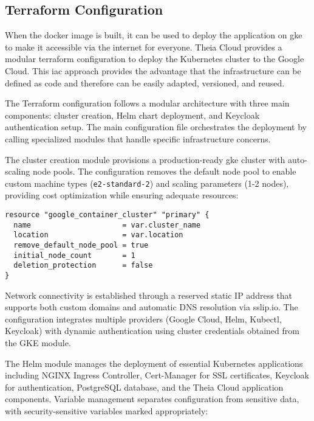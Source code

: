  \subsection{Terraform Configuration}
\label{subsec:terraform-configuration}

When the docker image is built, it can be used to deploy the application on \ac{gke} to make it accessible via the internet for everyone. Theia Cloud provides a modular terraform \cite{terraform-repo} configuration to deploy the Kubernetes cluster to the Google Cloud. This \ac{iac} approach provides the advantage that the infrastructure can be defined as code and therefore can be easily adapted, versioned, and reused.

The Terraform configuration follows a modular architecture with three main components: cluster creation, Helm chart deployment, and Keycloak authentication setup. The main configuration file orchestrates the deployment by calling specialized modules that handle specific infrastructure concerns.

The cluster creation module provisions a production-ready \ac{gke} cluster with auto-scaling node pools. The configuration removes the default node pool to enable custom machine types (\texttt{e2-standard-2}) and scaling parameters (1-2 nodes), providing cost optimization while ensuring adequate resources:

\begin{lstlisting}[language=hcl, caption=GKE Cluster Configuration]
resource "google_container_cluster" "primary" {
  name                     = var.cluster_name
  location                 = var.location
  remove_default_node_pool = true
  initial_node_count       = 1
  deletion_protection      = false
}
\end{lstlisting}

Network connectivity is established through a reserved static IP address that supports both custom domains and automatic DNS resolution via sslip.io. The configuration integrates multiple providers (Google Cloud, Helm, Kubectl, Keycloak) with dynamic authentication using cluster credentials obtained from the GKE module.

The Helm module manages the deployment of essential Kubernetes applications including NGINX Ingress Controller, Cert-Manager for SSL certificates, Keycloak for authentication, PostgreSQL database, and the Theia Cloud application components. Variable management separates configuration from sensitive data, with security-sensitive variables marked appropriately:

